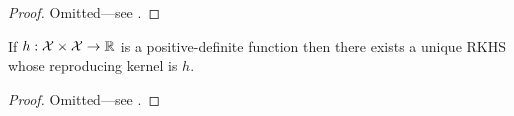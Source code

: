 \begin{proof}
  Omitted---see \citet{sejdinovic2012}.
\end{proof}

% 

\begin{theorem}\label{thm:moorea}
  If $h:{\mathcal X}\times{\mathcal X}\to\mathbb{R}$ is a positive-definite function then there exists a unique RKHS whose reproducing kernel is $h$.
\end{theorem}

\begin{proof}
  Omitted---see \citet{berlinet2011reproducing}.
\end{proof}


